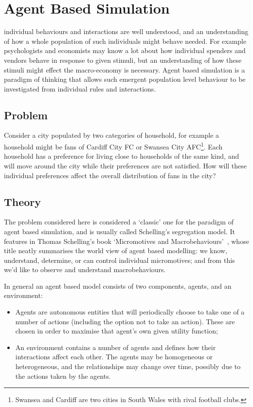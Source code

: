 \chapter[Agent Based Simulation]{Agent Based Simulation}\label{chp:agent_based_simulation}

 individual behaviours and
interactions are well understood,
and an understanding of how a whole population of such
individuals might behave needed. For example psychologists and economists may know a
lot about how individual spenders and vendors behave in response to given
stimuli, but an understanding of how these stimuli might effect the
macro-economy is necessary.
Agent based simulation is a paradigm of
thinking that allows such emergent population level behaviour to be investigated
from individual rules and interactions.

\section{Problem}\label{sec:agent_based_simulation_problem}

Consider a city populated by two categories of household, for example a household
might be fans of Cardiff City FC or Swansea City AFC\footnote{Swansea and
Cardiff are two cities in South Wales with rival football clubs.}.
Each household has a
preference for living close to households of the same kind, and will move
around the city while their preferences are not satisfied.
How will these individual preferences affect the overall distribution of fans in
the city?

\section{Theory}\label{sec:agent_based_simulation_theory}

The problem considered here is considered a `classic' one for the paradigm of
agent based simulation, and is usually called Schelling's segregation model.
It features in Thomas Schelling's book `Micromotives and
Macrobehaviours'~\cite{schelling2006micromotives}, whose
title neatly summarises the world view of agent based modelling: we know,
understand, determine, or can control individual micromotives; and from this
we'd like to observe and understand macrobehaviours.

In general an agent based model consists of two components, agents, and an
environment:

\begin{itemize}
  \item Agents are autonomous entities that will periodically choose to take one
        of a number of actions (including the option not to take an action).
        These are chosen in order to maximise that agent's own given utility
        function;
  \item An environment contains a number of agents and defines how their
        interactions affect each other.
        The agents may be homogeneous or heterogeneous, and the
        relationships may change over time, possibly due to the actions taken
        by the agents.
\end{itemize}

